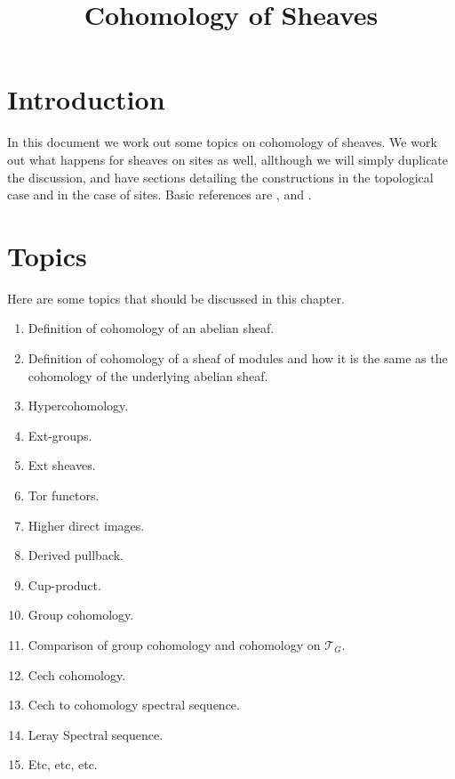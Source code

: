 

%


\title{Cohomology of Sheaves}


\maketitle

\label{section-phantom}

\tableofcontents

\section{Introduction}
\label{section-introduction}

\noindent
In this document we work out some topics on cohomology of sheaves.
We work out what happens for sheaves on sites
as well, allthough we will simply duplicate the discussion,
and have sections detailing the constructions in the topological
case and in the case of sites.
Basic references are \cite{SGA4}, \cite{Godement} and \cite{Iversen}.

\section{Topics}
\label{section-topics}

\noindent
Here are some topics that should be discussed in this chapter.
\begin{enumerate}
\item Definition of cohomology of an abelian sheaf.
\item Definition of cohomology of a sheaf of modules and
how it is the same as the cohomology of the underlying abelian sheaf.
\item Hypercohomology.
\item Ext-groups.
\item Ext sheaves.
\item Tor functors.
\item Higher direct images.
\item Derived pullback.
\item Cup-product.
\item Group cohomology.
\item Comparison of group cohomology and cohomology on $\mathcal{T}_G$.
\item Cech cohomology.
\item Cech to cohomology spectral sequence.
\item Leray Spectral sequence.
\item Etc, etc, etc.
\end{enumerate}



